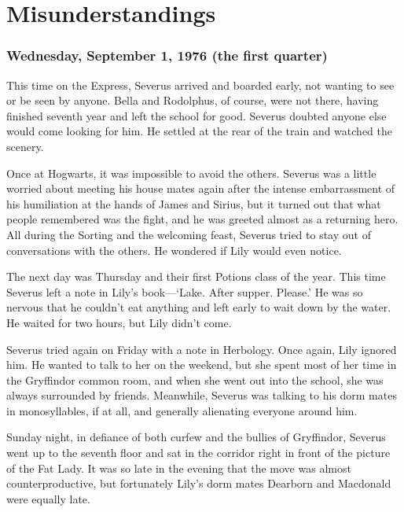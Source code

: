 
\chapter{Misunderstandings}

\subsection{Wednesday, September 1, 1976 (the first quarter)}

This time on the Express, Severus arrived and boarded early, not wanting to see or be seen by anyone. Bella and Rodolphus, of course, were not there, having finished seventh year and left the school for good. Severus doubted anyone else would come looking for him. He settled at the rear of the train and watched the scenery.

Once at Hogwarts, it was impossible to avoid the others. Severus was a little worried about meeting his house mates again after the intense embarrassment of his humiliation at the hands of James and Sirius, but it turned out that what people remembered was the fight, and he was greeted almost as a returning hero. All during the Sorting and the welcoming feast, Severus tried to stay out of conversations with the others. He wondered if Lily would even notice.

The next day was Thursday and their first Potions class of the year. This time Severus left a note in Lily's book—`Lake. After supper. Please.' He was so nervous that he couldn't eat anything and left early to wait down by the water. He waited for two hours, but Lily didn't come.

Severus tried again on Friday with a note in Herbology. Once again, Lily ignored him. He wanted to talk to her on the weekend, but she spent most of her time in the Gryffindor common room, and when she went out into the school, she was always surrounded by friends. Meanwhile, Severus was talking to his dorm mates in monosyllables, if at all, and generally alienating everyone around him.

Sunday night, in defiance of both curfew and the bullies of Gryffindor, Severus went up to the seventh floor and sat in the corridor right in front of the picture of the Fat Lady. It was so late in the evening that the move was almost counterproductive, but fortunately Lily's dorm mates Dearborn and Macdonald were equally late.

